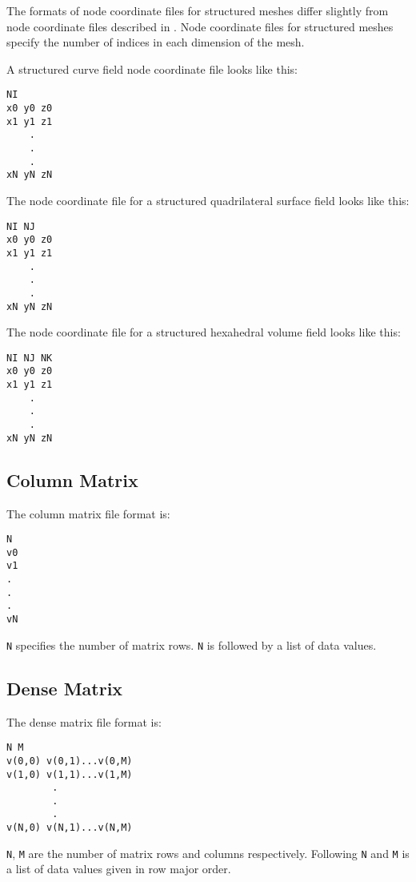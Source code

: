 The formats of node coordinate files for structured meshes differ
slightly from node coordinate files described in .  Node coordinate files
for structured meshes specify the number of indices in each dimension
of the mesh.

A structured curve field node coordinate file looks like this:

\begin{verbatim}
NI
x0 y0 z0
x1 y1 z1
    .
    .
    .
xN yN zN
\end{verbatim}

The node coordinate file for a structured quadrilateral surface field
looks like this:

\begin{verbatim}
NI NJ
x0 y0 z0
x1 y1 z1
    .
    .
    .
xN yN zN
\end{verbatim}

The node coordinate file for a structured hexahedral volume field
looks like this:

\begin{verbatim}
NI NJ NK
x0 y0 z0
x1 y1 z1
    .
    .
    .
xN yN zN
\end{verbatim}


\subsection{Column Matrix}
\label{sec:colmat}

The column matrix file format is:

\begin{verbatim}
N
v0 
v1
.
.
.
vN
\end{verbatim}

\verb|N| specifies the number of matrix rows.  \verb|N| is followed by
a list of data values.

\subsection{Dense Matrix}
\label{sec:dense_matrix}

The dense matrix file format is:

\begin{verbatim}
N M
v(0,0) v(0,1)...v(0,M)
v(1,0) v(1,1)...v(1,M)
        .
        .
        .
v(N,0) v(N,1)...v(N,M)
\end{verbatim}

\verb|N|, \verb|M| are the number of matrix rows and columns
respectively.  Following \verb|N| and \verb|M| is a list of data
values given in row major order.


